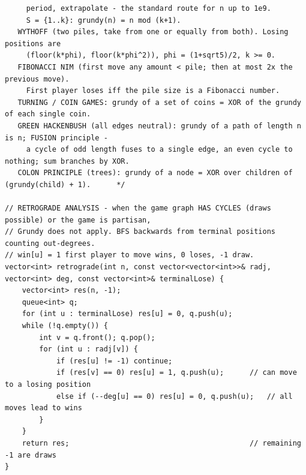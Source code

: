 \documentclass[9pt,a4paper,twocolumn]{extarticle}
\begin{document}
\begin{lstlisting}
     period, extrapolate - the standard route for n up to 1e9.
     S = {1..k}: grundy(n) = n mod (k+1).
   WYTHOFF (two piles, take from one or equally from both). Losing positions are
     (floor(k*phi), floor(k*phi^2)), phi = (1+sqrt5)/2, k >= 0.
   FIBONACCI NIM (first move any amount < pile; then at most 2x the previous move).
     First player loses iff the pile size is a Fibonacci number.
   TURNING / COIN GAMES: grundy of a set of coins = XOR of the grundy of each single coin.
   GREEN HACKENBUSH (all edges neutral): grundy of a path of length n is n; FUSION principle -
     a cycle of odd length fuses to a single edge, an even cycle to nothing; sum branches by XOR.
   COLON PRINCIPLE (trees): grundy of a node = XOR over children of (grundy(child) + 1).      */

// RETROGRADE ANALYSIS - when the game graph HAS CYCLES (draws possible) or the game is partisan,
// Grundy does not apply. BFS backwards from terminal positions counting out-degrees.
// win[u] = 1 first player to move wins, 0 loses, -1 draw.
vector<int> retrograde(int n, const vector<vector<int>>& radj, vector<int> deg, const vector<int>& terminalLose) {
    vector<int> res(n, -1);
    queue<int> q;
    for (int u : terminalLose) res[u] = 0, q.push(u);
    while (!q.empty()) {
        int v = q.front(); q.pop();
        for (int u : radj[v]) {
            if (res[u] != -1) continue;
            if (res[v] == 0) res[u] = 1, q.push(u);      // can move to a losing position
            else if (--deg[u] == 0) res[u] = 0, q.push(u);   // all moves lead to wins
        }
    }
    return res;                                          // remaining -1 are draws
}
\end{lstlisting}

\filbreak
\end{document}
